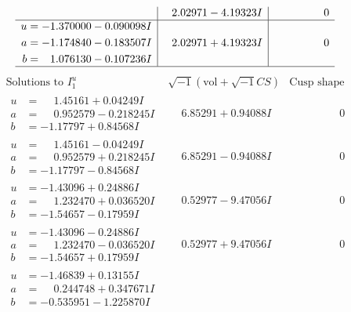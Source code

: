 \documentclass[1p]{elsarticle_modified}
\theoremstyle{definition}
\newcommand{\I}{\sqrt{-1}}
\begin{document}
$$\begin{array}{c|c|c}
 & \phantom{-}2.02971 - 4.19323 I & \phantom{-0.000000 } 0 \\ \hline\begin{aligned}
u &= -1.370000 - 0.090098 I \\
a &= -1.174840 - 0.183507 I \\
b &= \phantom{-}1.076130 - 0.107236 I\end{aligned}
 & \phantom{-}2.02971 + 4.19323 I & \phantom{-0.000000 } 0\\
 \hline 
 \end{array}$$\newpage$$\begin{array}{c|c|c}  
\text{Solutions to }I^u_{1}& \I (\text{vol} + \sqrt{-1}CS) & \text{Cusp shape}\\
 \hline 
\begin{aligned}
u &= \phantom{-}1.45161 + 0.04249 I \\
a &= \phantom{-}0.952579 - 0.218245 I \\
b &= -1.17797 + 0.84568 I\end{aligned}
 & \phantom{-}6.85291 + 0.94088 I & \phantom{-0.000000 } 0 \\ \hline\begin{aligned}
u &= \phantom{-}1.45161 - 0.04249 I \\
a &= \phantom{-}0.952579 + 0.218245 I \\
b &= -1.17797 - 0.84568 I\end{aligned}
 & \phantom{-}6.85291 - 0.94088 I & \phantom{-0.000000 } 0 \\ \hline\begin{aligned}
u &= -1.43096 + 0.24886 I \\
a &= \phantom{-}1.232470 + 0.036520 I \\
b &= -1.54657 - 0.17959 I\end{aligned}
 & \phantom{-}0.52977 - 9.47056 I & \phantom{-0.000000 } 0 \\ \hline\begin{aligned}
u &= -1.43096 - 0.24886 I \\
a &= \phantom{-}1.232470 - 0.036520 I \\
b &= -1.54657 + 0.17959 I\end{aligned}
 & \phantom{-}0.52977 + 9.47056 I & \phantom{-0.000000 } 0 \\ \hline\begin{aligned}
u &= -1.46839 + 0.13155 I \\
a &= \phantom{-}0.244748 + 0.347671 I \\
b &= -0.535951 - 1.225870 I\end{aligned}

\end{array}$$
\end{document}
